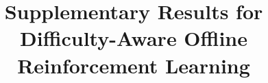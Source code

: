 \documentclass[conference]{IEEEtran}
\begin{document}
\title{Supplementary Results for Difficulty-Aware Offline Reinforcement Learning}
\author{}
\maketitle













\end{document}
